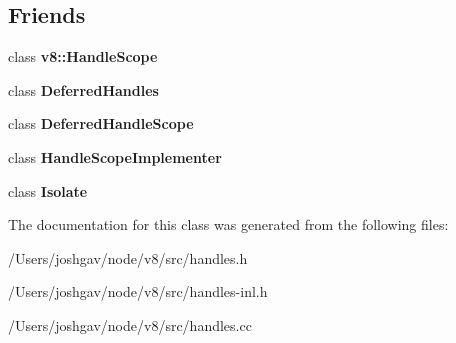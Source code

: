 \subsection*{Friends}
\begin{DoxyCompactItemize}
\item 
class {\bfseries v8\+::\+Handle\+Scope}\hypertarget{classv8_1_1internal_1_1_handle_scope_a8b16bf00a6bc5a91a76e86067d2f9dfc}{}\label{classv8_1_1internal_1_1_handle_scope_a8b16bf00a6bc5a91a76e86067d2f9dfc}

\item 
class {\bfseries Deferred\+Handles}\hypertarget{classv8_1_1internal_1_1_handle_scope_abf66bd266bd1fddbc859832c4838b436}{}\label{classv8_1_1internal_1_1_handle_scope_abf66bd266bd1fddbc859832c4838b436}

\item 
class {\bfseries Deferred\+Handle\+Scope}\hypertarget{classv8_1_1internal_1_1_handle_scope_ab79a97e63b62ac3e95a40640e3e70f96}{}\label{classv8_1_1internal_1_1_handle_scope_ab79a97e63b62ac3e95a40640e3e70f96}

\item 
class {\bfseries Handle\+Scope\+Implementer}\hypertarget{classv8_1_1internal_1_1_handle_scope_a4212b6d1addb496cb92d67a2e399a1f3}{}\label{classv8_1_1internal_1_1_handle_scope_a4212b6d1addb496cb92d67a2e399a1f3}

\item 
class {\bfseries Isolate}\hypertarget{classv8_1_1internal_1_1_handle_scope_aba4f0964bdacf2bbf62cf876e5d28d0a}{}\label{classv8_1_1internal_1_1_handle_scope_aba4f0964bdacf2bbf62cf876e5d28d0a}

\end{DoxyCompactItemize}


The documentation for this class was generated from the following files\+:\begin{DoxyCompactItemize}
\item 
/\+Users/joshgav/node/v8/src/handles.\+h\item 
/\+Users/joshgav/node/v8/src/handles-\/inl.\+h\item 
/\+Users/joshgav/node/v8/src/handles.\+cc\end{DoxyCompactItemize}
